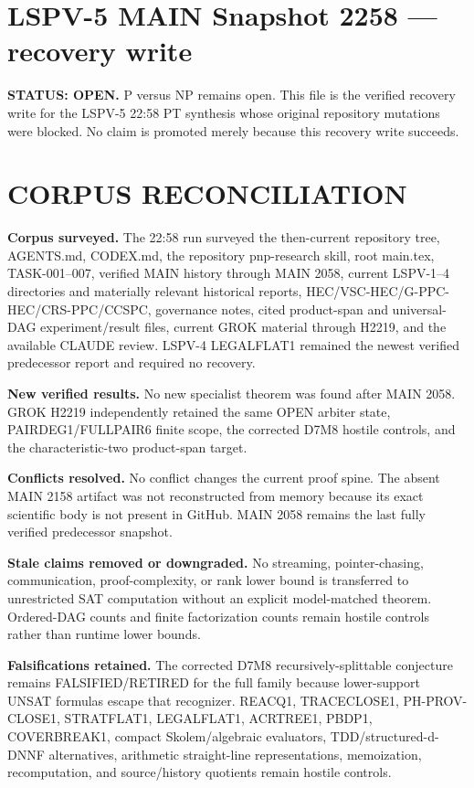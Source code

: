 \documentclass[11pt]{article}
\begin{document}
\section*{LSPV-5 MAIN Snapshot 2258 --- recovery write}
\textbf{STATUS: OPEN.} P versus NP remains open. This file is the verified recovery write for the LSPV-5 22:58 PT synthesis whose original repository mutations were blocked. No claim is promoted merely because this recovery write succeeds.

\section*{CORPUS RECONCILIATION}
\textbf{Corpus surveyed.}
The 22:58 run surveyed the then-current repository tree, AGENTS.md, CODEX.md, the repository pnp-research skill, root main.tex, TASK-001--007, verified MAIN history through MAIN 2058, current LSPV-1--4 directories and materially relevant historical reports, HEC/VSC-HEC/G-PPC-HEC/CRS-PPC/CCSPC, governance notes, cited product-span and universal-DAG experiment/result files, current GROK material through H2219, and the available CLAUDE review. LSPV-4 LEGALFLAT1 remained the newest verified predecessor report and required no recovery.

\textbf{New verified results.}
No new specialist theorem was found after MAIN 2058. GROK H2219 independently retained the same OPEN arbiter state, PAIRDEG1/FULLPAIR6 finite scope, the corrected D7M8 hostile controls, and the characteristic-two product-span target.

\textbf{Conflicts resolved.}
No conflict changes the current proof spine. The absent MAIN 2158 artifact was not reconstructed from memory because its exact scientific body is not present in GitHub. MAIN 2058 remains the last fully verified predecessor snapshot.

\textbf{Stale claims removed or downgraded.}
No streaming, pointer-chasing, communication, proof-complexity, or rank lower bound is transferred to unrestricted SAT computation without an explicit model-matched theorem. Ordered-DAG counts and finite factorization counts remain hostile controls rather than runtime lower bounds.

\textbf{Falsifications retained.}
The corrected D7M8 recursively-splittable conjecture remains FALSIFIED/RETIRED for the full family because lower-support UNSAT formulas escape that recognizer. REACQ1, TRACECLOSE1, PH-PROV-CLOSE1, STRATFLAT1, LEGALFLAT1, ACRTREE1, PBDP1, COVERBREAK1, compact Skolem/algebraic evaluators, TDD/structured-d-DNNF alternatives, arithmetic straight-line representations, memoization, recomputation, and source/history quotients remain hostile controls.
\end{document}
